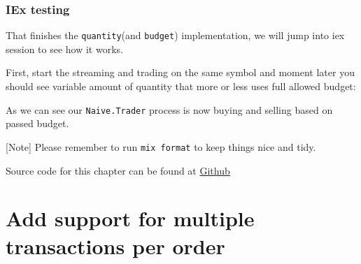 \documentclass[
  oneside]{book}
\newenvironment{Shaded}{\begin{snugshade}}{\end{snugshade}}
\newcommand{\AttributeTok}[1]{\textcolor[rgb]{0.77,0.63,0.00}{#1}}
\newcommand{\CommentTok}[1]{\textcolor[rgb]{0.56,0.35,0.01}{\textit{#1}}}
\newcommand{\ErrorTok}[1]{\textcolor[rgb]{0.64,0.00,0.00}{\textbf{#1}}}
\newcommand{\ExtensionTok}[1]{#1}
\newcommand{\KeywordTok}[1]{\textcolor[rgb]{0.13,0.29,0.53}{\textbf{#1}}}
\newcommand{\NormalTok}[1]{#1}
\newcommand{\OperatorTok}[1]{\textcolor[rgb]{0.81,0.36,0.00}{\textbf{#1}}}
\newcommand{\StringTok}[1]{\textcolor[rgb]{0.31,0.60,0.02}{#1}}
\begin{document}
\hypertarget{iex-testing-2}{%
\subsection{IEx testing}\label{iex-testing-2}}

That finishes the \texttt{quantity}(and \texttt{budget}) implementation, we will jump into iex session to see how it works.

First, start the streaming and trading on the same symbol and moment later you should see variable amount of quantity that more or less uses full allowed budget:

\begin{Shaded}
\end{Shaded}

As we can see our \texttt{Naive.Trader} process is now buying and selling based on passed budget.

{[}Note{]} Please remember to run \texttt{mix\ format} to keep things nice and tidy.

Source code for this chapter can be found at \href{https://github.com/frathon/create-a-cryptocurrency-trading-bot-in-elixir-source-code/tree/chapter_07}{Github}

\hypertarget{add-support-for-multiple-transactions-per-order}{%
\chapter{Add support for multiple transactions per order}\label{add-support-for-multiple-transactions-per-order}}
\end{document}
